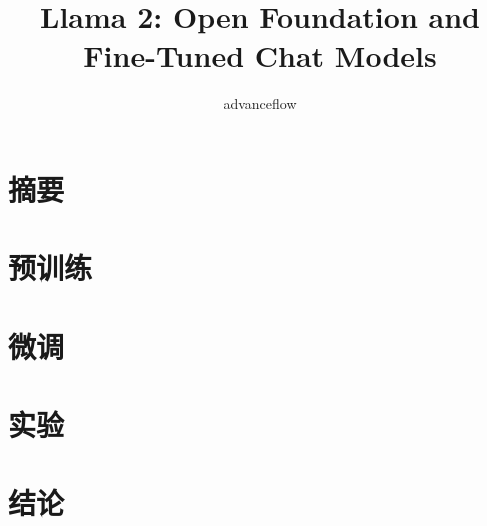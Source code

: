 \documentclass[lang=cn,a4paper]{elegantpaper}
\title{Llama 2: Open Foundation and Fine-Tuned Chat Models}
\author{advanceflow}
\begin{document}
\maketitle

\begin{abstract}

\end{abstract}

\section{摘要}

\section{预训练}
\section{微调}
\section{实验}
\section{结论}


\printbibliography

\end{document}
